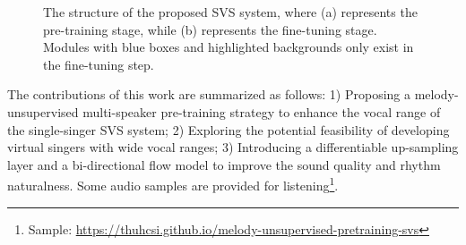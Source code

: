 
\begin{figure*}[ht]
  \centering
  \quad %
  \caption{The structure of the proposed SVS system, where (a) represents the pre-training stage, while (b) represents the fine-tuning stage. Modules with blue boxes and highlighted backgrounds only exist in the fine-tuning step.}
  \label{fig: architecture}
\end{figure*}




The contributions of this work are summarized as follows: 1) Proposing a melody-unsupervised multi-speaker pre-training strategy to enhance the vocal range of the single-singer SVS system; 2) Exploring the potential feasibility of developing virtual singers with wide vocal ranges; 3) Introducing a differentiable up-sampling layer and a bi-directional flow model to improve the sound quality and rhythm naturalness. Some audio samples are provided for listening\footnote{Sample: \href{https://thuhcsi.github.io/melody-unsupervised-pretraining-svs/}{https://thuhcsi.github.io/melody-unsupervised-pretraining-svs}}.

